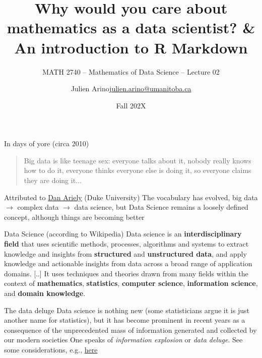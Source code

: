 \documentclass[aspectratio=169]{beamer}\usepackage[]{graphicx}\usepackage[]{xcolor}
\subtitle{MATH 2740 -- Mathematics of Data Science -- Lecture 02}
\author{\texorpdfstring{Julien Arino\newline\url{julien.arino@umanitoba.ca}}{Julien Arino}}
\institute{Department of Mathematics @ University of Manitoba}
\date{Fall 202X}
\title{Why would you care about mathematics as a data scientist? \& An introduction to R Markdown}
\begin{document}





\begin{frame}{In days of yore (circa 2010)}
\begin{quote}
Big data is like teenage sex: everyone talks about it, nobody really knows how to do it, everyone thinks everyone else is doing it, so everyone claims they are doing it...
\end{quote}

Attributed to \href{https://twitter.com/danariely/status/287952257926971392?lang=en}{Dan Ariely} (Duke University)
\vfill
The vocabulary has evolved, big data $\to$ complex data $\to$ data science, but Data Science remains a loosely defined concept, although things are becoming better
\end{frame}

\begin{frame}{Data Science (according to Wikipedia)}
Data science is an \textbf{interdisciplinary field} that uses scientific methods, processes, algorithms and systems to extract knowledge and insights from \textbf{structured} and \textbf{unstructured data}, and apply knowledge and actionable insights from data across a broad range of application domains.
\vfill
[..] It uses techniques and theories drawn from many fields within the context of \textbf{mathematics}, \textbf{statistics}, \textbf{computer science}, \textbf{information science}, and \textbf{domain knowledge}.
\end{frame}

\begin{frame}{The data deluge}
\bbullet Data science is nothing new (some statisticians argue it is just another name for statistics), but it has become prominent in recent years as a consequence of the unprecedented mass of information generated and collected by our modern societies
\vfill
\bbullet One speaks of \textit{information explosion} or \textit{data deluge}. See some considerations, e.g., \href{https://bernardmarr.com/how-much-data-is-there-in-the-world/}{here}
\end{frame}
\end{document}
